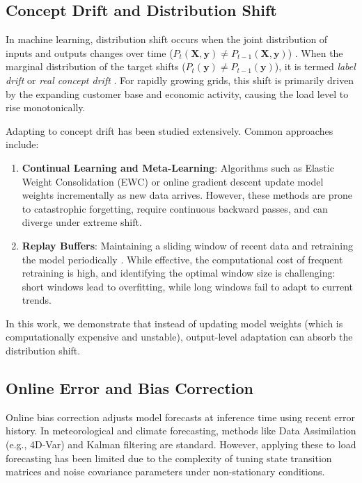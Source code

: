 \documentclass[journal]{IEEEtran}
\begin{document}
\subsection{Concept Drift and Distribution Shift}
In machine learning, distribution shift occurs when the joint distribution of inputs and outputs changes over time ($P_t(\mathbf{X}, \mathbf{y}) \neq P_{t-1}(\mathbf{X}, \mathbf{y})$) \cite{gama2014}. When the marginal distribution of the target shifts ($P_t(\mathbf{y}) \neq P_{t-1}(\mathbf{y})$), it is termed \textit{label drift} or \textit{real concept drift} \cite{lu2018}. For rapidly growing grids, this shift is primarily driven by the expanding customer base and economic activity, causing the load level to rise monotonically.

Adapting to concept drift has been studied extensively. Common approaches include:
\begin{enumerate}
    \item \textbf{Continual Learning and Meta-Learning}: Algorithms such as Elastic Weight Consolidation (EWC) \cite{lu2018} or online gradient descent update model weights incrementally as new data arrives. However, these methods are prone to catastrophic forgetting, require continuous backward passes, and can diverge under extreme shift.
    \item \textbf{Replay Buffers}: Maintaining a sliding window of recent data and retraining the model periodically \cite{webb2016}. While effective, the computational cost of frequent retraining is high, and identifying the optimal window size is challenging: short windows lead to overfitting, while long windows fail to adapt to current trends.
\end{enumerate}
In this work, we demonstrate that instead of updating model weights (which is computationally expensive and unstable), output-level adaptation can absorb the distribution shift.

\subsection{Online Error and Bias Correction}
Online bias correction adjusts model forecasts at inference time using recent error history. In meteorological and climate forecasting, methods like Data Assimilation (e.g., 4D-Var) \cite{farchi2024} and Kalman filtering \cite{harvey1990} are standard. However, applying these to load forecasting has been limited due to the complexity of tuning state transition matrices and noise covariance parameters under non-stationary conditions.
\end{document}
